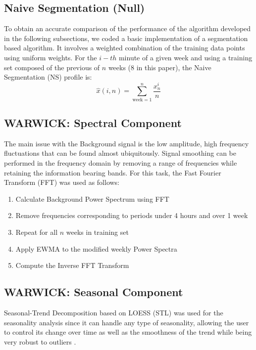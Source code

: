 \documentclass[a4paper, 10pt, conference]{ieeeconf}      %
\begin{document}
\subsection{Naive Segmentation (Null)}
To obtain an accurate comparison of the performance of the algorithm developed in the following subsections, we coded a basic implementation of a segmentation based algorithm. 
It involves a weighted combination of the training data points using uniform weights. 
For the $i-th$ minute of a given week and using a training set composed of the previous of $n$ weeks (8 in this paper), the Naive Segmentation (NS) profile is:
\begin{equation}
\hat{x}(i,n) = \sum_{\textrm{week}=1}^{n} \frac{x^i_n}{n} 
\end{equation}

\subsection{WARWICK: Spectral Component}
\label{algostart}
The main issue with the Background signal is the low amplitude, high frequency fluctuations that can be found almost ubiquitously. 
Signal smoothing can be performed in the frequency domain by removing a range of frequencies while retaining the information bearing bands.
For this task, the Fast Fourier Transform (FFT) \cite{FFT} was used as follows:
\begin{enumerate}
	\item Calculate Background Power Spectrum using FFT
	\item Remove frequencies corresponding to periods under 4 hours and over 1 week
	\item Repeat for all $n$ weeks in training set
    \item Apply EWMA to the modified weekly Power Spectra
	\item Compute the Inverse FFT Transform
\end{enumerate}
\subsection{WARWICK: Seasonal Component}
Seasonal-Trend Decomposition based on LOESS (STL) \cite{STL} was used for the seasonality analysis since it can handle any type of seasonality, allowing the user to control its change over time as well as the smoothness of the trend while being very robust to outliers \cite{forecasting}.\\
\end{document}
